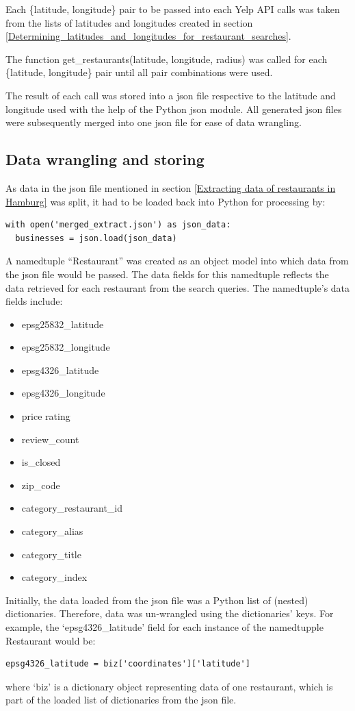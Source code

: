 \documentclass[a4paper, 11pt, oneside]{Thesis}  %
\begin{document}
Each \{latitude, longitude\} pair to be passed into each Yelp API calls was taken from the lists of latitudes and longitudes created in section \ref{Determining_latitudes_and_longitudes_for_restaurant_searches}.

The function get\_restaurants(latitude, longitude, radius) was called for each \{latitude, longitude\} pair until all pair combinations were used.

The result of each call was stored into a \ac{json} file respective to the latitude and longitude used with the help of the Python \ac{json} \cite{json.encoder} module. All generated \ac{json} files were subsequently merged into one \ac{json} file for ease of data wrangling.

\subsection{Data wrangling and storing}

As data in the \ac{json} file mentioned in section \ref{Extracting data of restaurants in Hamburg} was split, it had to be loaded back into Python for processing by:
\begin{verbatim}
with open('merged_extract.json') as json_data:
  businesses = json.load(json_data)
\end{verbatim}

A namedtuple ``Restaurant'' was created as an object model into which data from the \ac{json} file would be passed. The data fields for this namedtuple reflects the data retrieved for each restaurant from the search queries. The namedtuple’s data fields include:
\begin{itemize}
\item epsg25832\_latitude
\item epsg25832\_longitude
\item epsg4326\_latitude
\item epsg4326\_longitude
\item price rating
\item review\_count
\item is\_closed
\item zip\_code
\item category\_restaurant\_id 
\item category\_alias
\item category\_title
\item category\_index
\end{itemize}

Initially, the data loaded from the \ac{json} file was a Python list of (nested) dictionaries. Therefore, data was un-wrangled using the dictionaries’ keys. For example, the `epsg4326\_latitude’ field for each instance of the namedtupple Restaurant would be:
\begin{verbatim}
epsg4326_latitude = biz['coordinates']['latitude'] 
\end{verbatim}
where ‘biz’ is a dictionary object representing data of one restaurant, which is part of the loaded list of dictionaries from the \ac{json} file.
\end{document}
